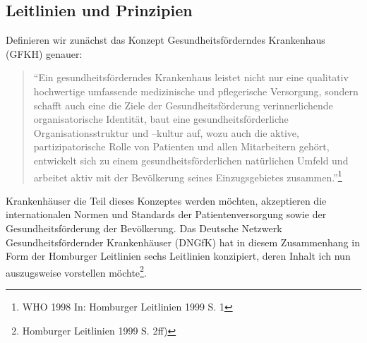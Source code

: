 \subsection{Leitlinien und Prinzipien}
\label{sec:LeitlinienUndPrinzipien}

Definieren wir zunächst das Konzept Gesundheitsförderndes Krankenhaus (GFKH) genauer: 

\begin{quotation}
"`Ein gesundheitsförderndes Krankenhaus leistet nicht nur eine qualitativ hochwertige umfassende medizinische und pflegerische Versorgung, sondern schafft auch eine die Ziele der Gesundheitsförderung verinnerlichende organisatorische Identität, baut eine gesundheitsförderliche Organisationsstruktur und –kultur auf, wozu auch die aktive, partizipatorische Rolle von Patienten und allen Mitarbeitern gehört, entwickelt sich zu einem gesundheitsförderlichen natürlichen Umfeld und arbeitet aktiv mit der Bevölkerung seines Einzugsgebietes zusammen."'\footnote{WHO 1998 In: Homburger Leitlinien 1999 S. 1}
\end{quotation}

Krankenhäuser die Teil dieses Konzeptes werden möchten, akzeptieren die internationalen Normen und Standards der Patientenversorgung sowie der Gesundheitsförderung der Bevölkerung. Das Deutsche Netzwerk Gesundheitsfördernder Krankenhäuser (DNGfK) hat in diesem Zusammenhang in Form der Homburger Leitlinien sechs Leitlinien konzipiert, deren Inhalt ich nun auszugsweise vorstellen möchte\footnote{Homburger Leitlinien 1999 S. 2ff)}. 

